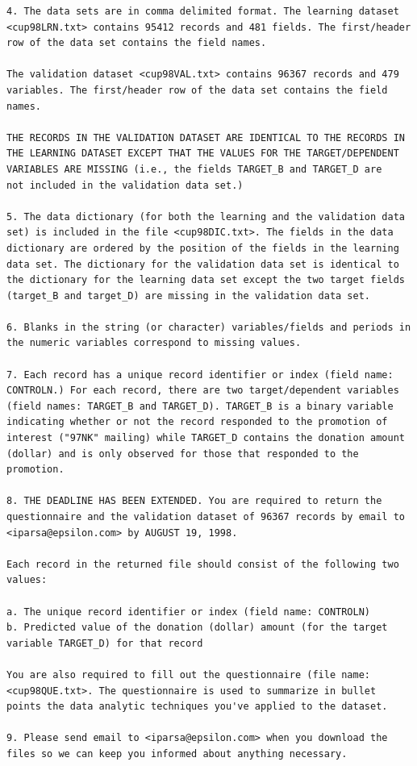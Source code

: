 \documentclass[
  11pt,
  a4paper,
  DIV=12,captions=tableheading,oneside,titlepage]{scrbook}
\begin{document}
\begin{verbatim}
4. The data sets are in comma delimited format. The learning dataset
<cup98LRN.txt> contains 95412 records and 481 fields. The first/header
row of the data set contains the field names.

The validation dataset <cup98VAL.txt> contains 96367 records and 479
variables. The first/header row of the data set contains the field
names.

THE RECORDS IN THE VALIDATION DATASET ARE IDENTICAL TO THE RECORDS IN
THE LEARNING DATASET EXCEPT THAT THE VALUES FOR THE TARGET/DEPENDENT
VARIABLES ARE MISSING (i.e., the fields TARGET_B and TARGET_D are
not included in the validation data set.)

5. The data dictionary (for both the learning and the validation data
set) is included in the file <cup98DIC.txt>. The fields in the data
dictionary are ordered by the position of the fields in the learning
data set. The dictionary for the validation data set is identical to
the dictionary for the learning data set except the two target fields
(target_B and target_D) are missing in the validation data set.

6. Blanks in the string (or character) variables/fields and periods in
the numeric variables correspond to missing values.

7. Each record has a unique record identifier or index (field name:
CONTROLN.) For each record, there are two target/dependent variables
(field names: TARGET_B and TARGET_D). TARGET_B is a binary variable
indicating whether or not the record responded to the promotion of
interest ("97NK" mailing) while TARGET_D contains the donation amount
(dollar) and is only observed for those that responded to the
promotion.

8. THE DEADLINE HAS BEEN EXTENDED. You are required to return the
questionnaire and the validation dataset of 96367 records by email to
<iparsa@epsilon.com> by AUGUST 19, 1998.

Each record in the returned file should consist of the following two
values:

a. The unique record identifier or index (field name: CONTROLN)
b. Predicted value of the donation (dollar) amount (for the target
variable TARGET_D) for that record 

You are also required to fill out the questionnaire (file name:
<cup98QUE.txt>. The questionnaire is used to summarize in bullet
points the data analytic techniques you've applied to the dataset.

9. Please send email to <iparsa@epsilon.com> when you download the
files so we can keep you informed about anything necessary.


\end{verbatim}
\end{document}
